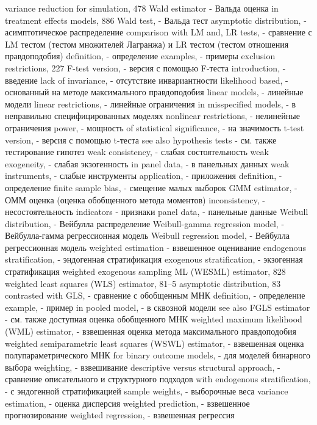 variance reduction for simulation, 478
Wald estimator - Вальда оценка
in treatment effects models, 886
Wald test, - Вальда тест
asymptotic distribution, - асимптотическое распределение
comparison with LM and, LR tests, - сравнение с LM тестом (тестом множителей Лагранжа) и LR тестом (тестом отношения правдоподобия)
definition, - определение
examples, - примеры
exclusion restrictions, 227
F-test version, - версия с помощью F-теста
introduction, - введение
lack of invariance, - отсутствие инвариантности
likelihood based, - основанный на методе максимального правдоподобия
linear models, - линейные модели
linear restrictions, - линейные ограничения
in misspecified models, - в неправильно специфицированных моделях
nonlinear restrictions, - нелинейные ограничения
power, - мощность
of statistical significance, - на значимость
t-test version, - версия с помощью t-теста
see also hypothesis tests - см. также тестирование гипотез
weak consistency, - слабая состоятельность
weak exogeneity, - слабая экзогенность
in panel data, - в панельных данных
weak instruments, - слабые инструменты
application, - приложения
definition, - определение
finite sample bias, - смещение малых выборок 
GMM estimator, - ОММ оценка (оценка обобщенного метода моментов)
inconsistency, - несостоятельность
indicators - признаки
panel data, - панельные данные
Weibull distribution, - Вейбулла распределение
Weibull-gamma regression model, - Вейбулла-гамма регрессионная модель
Weibull regression model, - Вейбулла регрессионная модель
weighted estimation - взвешенное оценивание
endogenous stratification, - эндогенная стратификация
exogenous stratification, - экзогенная стратификация
weighted exogenous sampling ML (WESML) estimator, 828
weighted least squares (WLS) estimator, 81–5 asymptotic distribution, 83
contrasted with GLS, - сравнение с обобщенным МНК
definition, - определение
example, - пример
in pooled model, - в сквозной модели 
see also FGLS estimator - см. также доступная оценка обобщенного МНК
weighted maximum likelihood (WML) estimator, - взвешенная оценка метода максимального правдоподобия
weighted semiparametric least squares (WSWL) estimator, - взвешенная оценка полупараметрического МНК
for binary outcome models, - для моделей бинарного выбора
weighting, - взвешивание
descriptive versus structural approach, - сравнение описательного и структурного подходов
with endogenous stratification, - с эндогенной стратификацией
sample weights, - выборочные веса
variance estimation, - оценка дисперсия
weighted prediction, - взвешенное прогнозирование 
weighted regression, - взвешенная регрессия 
